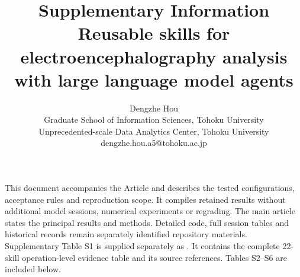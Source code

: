 \documentclass[10pt,a4paper]{article}
\title{Supplementary Information\\[6pt]\large Reusable skills for electroencephalography analysis with large language model agents}
\author{Dengzhe Hou\\\small Graduate School of Information Sciences, Tohoku University\\\small Unprecedented-scale Data Analytics Center, Tohoku University\\\small dengzhe.hou.a5@tohoku.ac.jp}
\date{}
\begin{document}
\maketitle
\noindent This document accompanies the Article and describes the tested configurations, acceptance rules and reproduction scope. It compiles retained results without additional model sessions, numerical experiments or regrading. The main article states the principal results and methods. Detailed code, full session tables and historical records remain separately identified repository materials.
\tableofcontents
\medskip
\noindent Supplementary Table S1 is supplied separately as . It contains the complete 22-skill operation-level evidence table and its source references. Tables S2--S6 are included below.





\clearpage
{}
\renewcommand{\refname}{Supplementary references}


\end{document}
